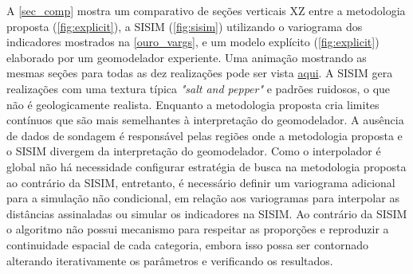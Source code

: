 A \autoref{sec_comp} mostra um comparativo de seções verticais XZ entre a metodologia proposta (\autoref{fig:explicit}), a SISIM (\autoref{fig:sisim}) utilizando o variograma dos indicadores mostrados na \autoref{ouro_vargs}, e um modelo explícito (\autoref{fig:explicit}) elaborado por um geomodelador experiente. Uma animação mostrando as mesmas seções para todas as dez realizações pode ser vista \href{https://github.com/robertorolo/assessing_geological_model_uncertainty_with_probability_fields/blob/main/ezgif-2-802d466feae1.gif}{aqui}. A SISIM gera realizações com uma textura típica \textit{"salt and pepper"} e padrões ruidosos, o que não é geologicamente realista. Enquanto a metodologia proposta cria limites contínuos que são mais semelhantes à interpretação do geomodelador. A ausência de dados de sondagem é responsável pelas regiões onde a metodologia proposta e o SISIM divergem da interpretação do geomodelador. Como o interpolador é global não há necessidade configurar estratégia de busca na metodologia proposta ao contrário da SISIM, entretanto, é necessário definir um variograma adicional para a simulação não condicional, em relação aos variogramas para interpolar as distâncias assinaladas ou simular os indicadores na SISIM. Ao contrário da SISIM o algoritmo não possui mecanismo para respeitar as proporções e reproduzir a continuidade espacial de cada categoria, embora isso possa ser contornado alterando iterativamente os parâmetros e verificando os resultados.

